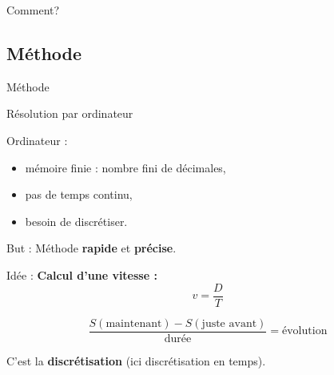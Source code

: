 \documentclass[11pt]{beamer}
\begin{document}
\begin{frame}
\begin{center}
Comment?
\end{center}
\end{frame}


\subsection{Méthode}
\begin{frame}{Méthode}
\begin{block}{}
Résolution par ordinateur
\end{block}
\pause

\begin{block}{Ordinateur :}
\begin{itemize}
\item mémoire finie : nombre fini de décimales,
\item pas de temps continu,
\item besoin de discrétiser.
\end{itemize}
\end{block}
\pause

\begin{block}{But :}
Méthode \textbf{rapide} et \textbf{précise}.
\end{block}
\end{frame}

\begin{frame}

\begin{block}{Idée :}
\textbf{Calcul d'une vitesse :}
\begin{equation}
v = \dfrac{D}{T}
\end{equation}
\end{block}

\pause
$$\dfrac{S(\text{maintenant}) - S(\text{juste avant})}{\text{durée}} = \text{évolution}$$

\pause
\begin{center}
\end{center}

C'est la \textbf{discrétisation} (ici discrétisation en temps).

\end{frame}
\end{document}
